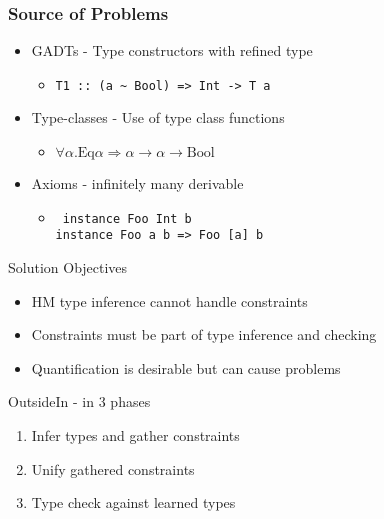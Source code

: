 \documentclass{beamer}
\begin{document}
\begin{frame}[fragile]
\frametitle{Source of Problems}
\begin{itemize}
\item GADTs - Type constructors with refined type
\begin{itemize}
\item \begin{lstlisting}
T1 :: (a ~ Bool) => Int -> T a
\end{lstlisting}
\end{itemize}
\item Type-classes - Use of type class functions
\begin{itemize}
\item $\forall \alpha . \mbox{Eq} \alpha \Rightarrow \alpha \rightarrow \alpha \rightarrow \mbox{Bool}$
\end{itemize}
\item Axioms - infinitely many derivable 
\begin{itemize}
\item \begin{lstlisting} instance Foo Int b
instance Foo a b => Foo [a] b
\end{lstlisting}
\end{itemize}
\end{itemize}
\end{frame}

\begin{frame}{Solution Objectives}
\begin{itemize}
\item HM type inference cannot handle constraints
\item Constraints must be part of type inference and checking
\item Quantification is desirable but can cause problems
\end{itemize}
\end{frame}

\begin{frame}{OutsideIn - in 3 phases}
\begin{enumerate}
   \item Infer types and gather constraints
   \item Unify gathered constraints
   \item Type check against learned types
\end{enumerate}
\end{frame}
\end{document}
